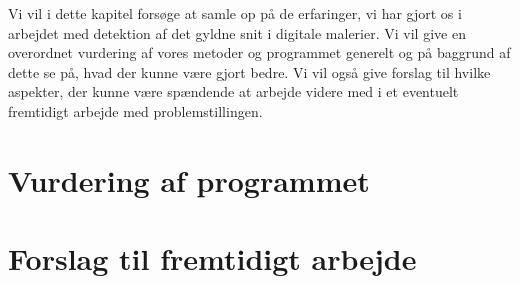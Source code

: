 {
{\sffamily Vi vil i dette kapitel forsøge at samle op på de erfaringer,
vi har gjort os i arbejdet med detektion af det gyldne snit i digitale
malerier. Vi vil give en overordnet vurdering af vores metoder og
programmet generelt og på baggrund af dette se på, hvad der kunne være
gjort bedre. Vi vil også give forslag til hvilke aspekter, der kunne
være spændende at arbejde videre med i et eventuelt fremtidigt arbejde
med problemstillingen.
}

\section{Vurdering af programmet}


\section{Forslag til fremtidigt arbejde}


}

